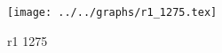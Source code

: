\begin{figure}[h] \centering \texttt{[image: ../../graphs/r1\_1275.tex]}\caption{r1 1275}\label{gr:r1_1275} \end{figure}

